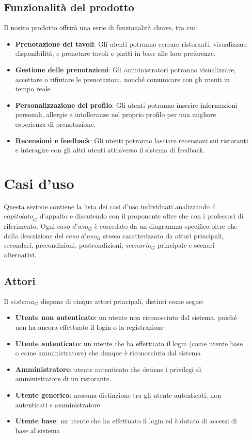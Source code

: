 \documentclass[12pt, oneside]{article}
\begin{document}
\subsection{Funzionalità del prodotto}
Il nostro prodotto offrirà una serie di funzionalità chiave, tra cui:
\begin{itemize}
\item \textbf{Prenotazione dei tavoli}: Gli utenti potranno cercare ristoranti, visualizzare disponibilità, e prenotare tavoli e piatti in base alle loro preferenze.
\item \textbf{Gestione delle prenotazioni}: Gli amministratori potranno visualizzare, accettare o rifiutare le prenotazioni, nonché comunicare con gli utenti in tempo reale.
\item \textbf{Personalizzazione del profilo}: Gli utenti potranno inserire informazioni personali, allergie e intolleranze nel proprio profilo per una migliore esperienza di prenotazione.
\item \textbf{Recensioni e feedback}: Gli utenti potranno lasciare recensioni sui ristoranti e interagire con gli altri utenti attraverso il sistema di feedback.
\end{itemize}


\newpage

\section{Casi d'uso}
Questa sezione contiene la lista dei casi d'uso individuati analizzando il $\textit{capitolato}_G$ d'appalto e discutendo con il proponente oltre che con i professori di riferimento. Ogni $\textit{caso d'uso}_G$ è corredato da un diagramma specifico oltre che dalla descrizione del $\textit{caso d'uso}_G$ stesso caratterizzato da attori principali, secondari, precondizioni, postcondizioni, $\textit{scenario}_G$ principale e scenari alternativi.
\subsection{Attori}
Il $\textit{sistema}_G$ dispone di cinque attori principali, distinti come segue:
\begin{itemize}
    \item \textbf{Utente non autenticato}: un utente non riconosciuto dal sistema, poiché non ha ancora  effettuato il login o la registrazione
    \item \textbf{Utente autenticato}: un utente che ha effettuato il login (come utente base o come amministratore) che dunque è riconosciuto dal sistema
    \item \textbf{Amministratore}: utente autenticato che detiene i privilegi di amministratore di un ristorante.
    \item \textbf{Utente generico}: nessuna distinzione tra gli utente autenticati, non autenticati e amministratore
    \item \textbf{Utente base}: un utente che ha effettuato il login ed è dotato di accessi di base al sistema
\end{itemize}
\end{document}
